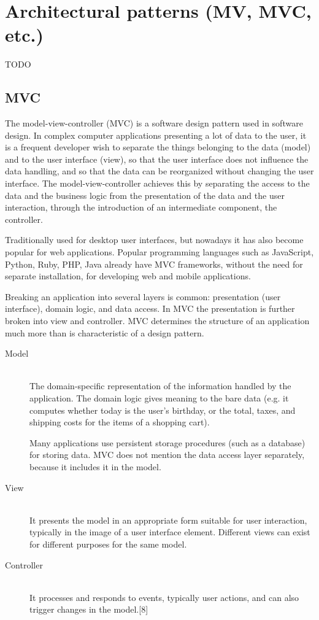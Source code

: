 \documentclass[margin=0px]{article}
\begin{document}
\section{Architectural patterns (MV, MVC, etc.)}
TODO

\subsection{MVC}
The model-view-controller (MVC) is a software design pattern used in software design. In complex computer applications presenting a lot of data to the user, it is a frequent developer wish to separate the things belonging to the data (model) and to the user interface (view), so that the user interface does not influence the data handling, and so that the data can be reorganized without changing the user interface. The model-view-controller achieves this by separating the access to the data and the business logic from the presentation of the data and the user interaction, through the introduction of an intermediate component, the controller.

Traditionally used for desktop user interfaces, but nowadays it has also become popular for web applications. Popular programming languages such as JavaScript, Python, Ruby, PHP, Java already have MVC frameworks, without the need for separate installation, for developing web and mobile applications.

Breaking an application into several layers is common: presentation (user interface), domain logic, and data access. In MVC the presentation is further broken into view and controller. MVC determines the structure of an application much more than is characteristic of a design pattern.
\begin{description}
    \item[Model] \hfill \\
        The domain-specific representation of the information handled by the application. The domain logic gives meaning to the bare data (e.g. it computes whether today is the user's birthday, or the total, taxes, and shipping costs for the items of a shopping cart).

        Many applications use persistent storage procedures (such as a database) for storing data. MVC does not mention the data access layer separately, because it includes it in the model.
    \item[View] \hfill \\
        It presents the model in an appropriate form suitable for user interaction, typically in the image of a user interface element. Different views can exist for different purposes for the same model.
    \item[Controller] \hfill \\
        It processes and responds to events, typically user actions, and can also trigger changes in the model.[8]
\end{description}
\end{document}
